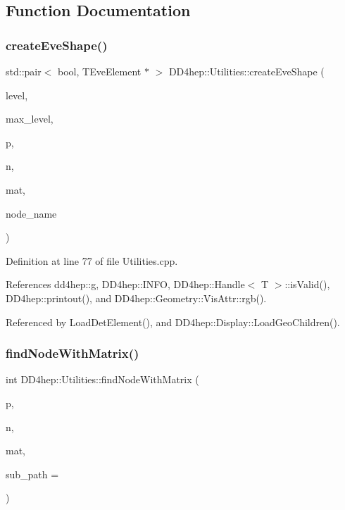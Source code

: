 \subsection{Function Documentation}
\hypertarget{namespace_d_d4hep_1_1_utilities_aa469540c9b22f32d6ac947c4fbe7a7dc}{}\label{namespace_d_d4hep_1_1_utilities_aa469540c9b22f32d6ac947c4fbe7a7dc} 
\subsubsection{\texorpdfstring{create\+Eve\+Shape()}{createEveShape()}}
{\footnotesize\ttfamily std\+::pair$<$ bool, T\+Eve\+Element $\ast$ $>$ D\+D4hep\+::\+Utilities\+::create\+Eve\+Shape (\begin{DoxyParamCaption}\item[{int}]{level,  }\item[{int}]{max\+\_\+level,  }\item[{T\+Eve\+Element $\ast$}]{p,  }\item[{T\+Geo\+Node $\ast$}]{n,  }\item[{T\+Geo\+H\+Matrix}]{mat,  }\item[{const std\+::string \&}]{node\+\_\+name }\end{DoxyParamCaption})}



Definition at line 77 of file Utilities.\+cpp.



References dd4hep\+::g, D\+D4hep\+::\+I\+N\+FO, D\+D4hep\+::\+Handle$<$ T $>$\+::is\+Valid(), D\+D4hep\+::printout(), and D\+D4hep\+::\+Geometry\+::\+Vis\+Attr\+::rgb().



Referenced by Load\+Det\+Element(), and D\+D4hep\+::\+Display\+::\+Load\+Geo\+Children().

\hypertarget{namespace_d_d4hep_1_1_utilities_a61171c4258ed951d93ba11763da066fc}{}\label{namespace_d_d4hep_1_1_utilities_a61171c4258ed951d93ba11763da066fc} 
\subsubsection{\texorpdfstring{find\+Node\+With\+Matrix()}{findNodeWithMatrix()}}
{\footnotesize\ttfamily int D\+D4hep\+::\+Utilities\+::find\+Node\+With\+Matrix (\begin{DoxyParamCaption}\item[{T\+Geo\+Node $\ast$}]{p,  }\item[{T\+Geo\+Node $\ast$}]{n,  }\item[{T\+Geo\+H\+Matrix $\ast$}]{mat,  }\item[{std\+::string $\ast$}]{sub\+\_\+path = {} }\end{DoxyParamCaption})}



